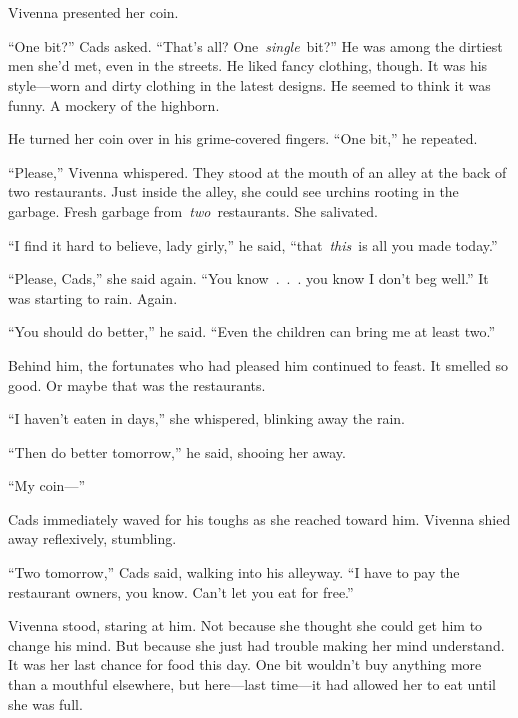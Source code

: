 \chapter{}

Vivenna presented her coin.

“One bit?” Cads asked. “That’s all? One~\textit{single}~bit?” He was among the dirtiest men she’d met, even in the streets. He liked fancy clothing, though. It was his style—worn and dirty clothing in the latest designs. He seemed to think it was funny. A mockery of the highborn.

He turned her coin over in his grime-covered fingers. “One bit,” he repeated.

“Please,” Vivenna whispered. They stood at the mouth of an alley at the back of two restaurants. Just inside the alley, she could see urchins rooting in the garbage. Fresh garbage from~\textit{two}~restaurants. She salivated.

“I find it hard to believe, lady girly,” he said, “that~\textit{this}~is all you made today.”

“Please, Cads,” she said again. “You know~.~.~. you know I don’t beg well.” It was starting to rain. Again.

“You should do better,” he said. “Even the children can bring me at least two.”

Behind him, the fortunates who had pleased him continued to feast. It smelled so good. Or maybe that was the restaurants.

“I haven’t eaten in days,” she whispered, blinking away the rain.

“Then do better tomorrow,” he said, shooing her away.

“My coin—”

Cads immediately waved for his toughs as she reached toward him. Vivenna shied away reflexively, stumbling.

“Two tomorrow,” Cads said, walking into his alleyway. “I have to pay the restaurant owners, you know. Can’t let you eat for free.”

Vivenna stood, staring at him. Not because she thought she could get him to change his mind. But because she just had trouble making her mind understand. It was her last chance for food this day. One bit wouldn’t buy anything more than a mouthful elsewhere, but here—last time—it had allowed her to eat until she was full.

